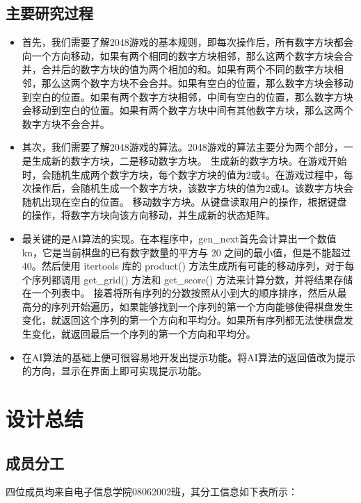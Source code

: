\documentclass[UTF8,AutoFakeBold,AutoFakeSlant,zihao=-4]{ctexart}
\begin{document}
\subsection{主要研究过程}
\begin{itemize}
  \item 首先，我们需要了解2048游戏的基本规则，即每次操作后，所有数字方块都会向一个方向移动，如果有两个相同的数字方块相邻，那么这两个数字方块会合并，合并后的数字方块的值为两个相加的和。如果有两个不同的数字方块相邻，那么这两个数字方块不会合并。如果有空白的位置，那么数字方块会移动到空白的位置。如果有两个数字方块相邻，中间有空白的位置，那么数字方块会移动到空白的位置。如果有两个数字方块中间有其他数字方块，那么这两个数字方块不会合并。
  \item 其次，我们需要了解2048游戏的算法。2048游戏的算法主要分为两个部分，一是生成新的数字方块，二是移动数字方块。
    \subitem 生成新的数字方块。在游戏开始时，会随机生成两个数字方块，每个数字方块的值为2或4。在游戏过程中，每次操作后，会随机生成一个数字方块，该数字方块的值为2或4。该数字方块会随机出现在空白的位置。
    \subitem 移动数字方块。从键盘读取用户的操作，根据键盘的操作，将数字方块向该方向移动，并生成新的状态矩阵。
  \item 最关键的是AI算法的实现。在本程序中，gen\_next首先会计算出一个数值 kn，它是当前棋盘的已有数字数量的平方与 20 之间的最小值，但是不能超过 40。然后使用 itertools 库的 product() 方法生成所有可能的移动序列，对于每个序列都调用 get\_grid() 方法和 get\_score() 方法来计算分数，并将结果存储在一个列表中。
  接着将所有序列的分数按照从小到大的顺序排序，然后从最高分的序列开始遍历，如果能够找到一个序列的第一个方向能够使得棋盘发生变化，就返回这个序列的第一个方向和平均分。如果所有序列都无法使棋盘发生变化，就返回最后一个序列的第一个方向和平均分。
  \item 在AI算法的基础上便可很容易地开发出提示功能。将AI算法的返回值改为提示的方向，显示在界面上即可实现提示功能。
\end{itemize}

\clearpage

\section{设计总结}

\subsection{成员分工}
四位成员均来自电子信息学院08062002班，其分工信息如下表所示：
\end{document}
